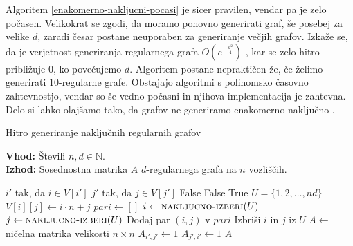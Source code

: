 Algoritem \ref{enakomerno-nakljucni-pocasi} je sicer pravilen, vendar pa je zelo počasen. Velikokrat se zgodi, da moramo ponovno generirati graf, še posebej za velike \(d\), zaradi česar postane neuporaben za generiranje večjih grafov. Izkaže se, da je verjetnost generiranja regularnega grafa \(O(e^{-\frac{d^2}{4}})\) \cite{STEGER_WORMALD_1999}, kar se zelo hitro približuje \(0\), ko povečujemo \(d\). Algoritem postane nepraktičen že, če želimo generirati \(10\)-regularne grafe. Obstajajo algoritmi s polinomsko časovno zahtevnostjo, vendar so še vedno počasni in njihova implementacija je zahtevna. Delo si lahko olajšamo tako, da grafov ne generiramo enakomerno naključno \cite{STEGER_WORMALD_1999}.

\begin{algorithm}[H]
    \caption{Hitro generiranje naključnih regularnih grafov}
    \label{enakomerno-nakljucni-hitro}
    \raggedright
    \textbf{Vhod:} Števili \(n, d \in \mathbb N\). \\
    \textbf{Izhod:} Sosednostna matrika \(A\) \(d\)-regularnega grafa na \(n\) vozliščih.
    \begin{algorithmic}[1]
        \State \(i'\) tak, da \(i\in V[i']\)
        \State \(j'\) tak, da \(j\in V[j']\)
        \State \Return False 
        \EndIf
        \State \Return False 
        \EndIf
        \State \Return True
        \EndFunction
        \State \(U = \{1, 2, \ldots, nd\}\) 
        \State \(V[i][j] \gets i\cdot n + j\) 
        \EndFor
        \EndFor
        \State \(pari \gets []\)
        \State \(i\gets \Call{nakljucno-izberi}{U}\)
        \State \(j\gets \Call{nakljucno-izberi}{U}\)
        \State Dodaj par \((i, j)\) v \(pari\)
        \State Izbriši \(i\) in \(j\) iz \(U\)
        \EndIf
        \EndWhile
        \State \(A \gets\) ničelna matrika velikosti \(n \times n\)
        \State \(A_{i', j'} \gets 1\)
        \State \(A_{j', i'} \gets 1\)
        \EndFor
        \State \Return $A$
        \EndFunction
    \end{algorithmic}
\end{algorithm}

